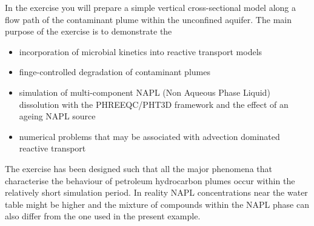 In the exercise you will prepare a simple vertical cross-sectional model 
along a flow path of the contaminant plume within the unconfined aquifer. 
The main purpose of the exercise is to demonstrate the

\begin{itemize}

\item incorporation of microbial kinetics into reactive transport models 

\item finge-controlled degradation of contaminant plumes

\item simulation of multi-component NAPL (Non Aqueous Phase Liquid) dissolution with the PHREEQC/PHT3D framework and the effect of an ageing NAPL source 

\item numerical problems that may be associated with advection dominated reactive transport

\end{itemize}

The exercise has been designed such that all the major phenomena that 
characterise the behaviour of petroleum hydrocarbon plumes occur within
the relatively short simulation period. In reality NAPL concentrations near the water table
might be higher and the mixture of compounds within the NAPL phase can 
also differ from the one used in the present example.

